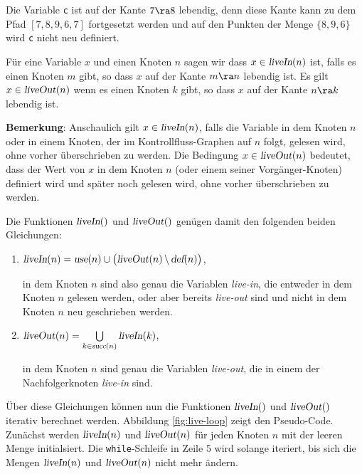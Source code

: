 \example
Die Variable \texttt{c} ist auf der Kante $7 \ra 8$ lebendig, denn diese Kante kann zu dem
Pfad $[7, 8, 9, 6, 7]$ fortgesetzt werden und auf den Punkten der Menge $\{8,9,6\}$ wird
\texttt{c} nicht neu definiert.

\begin{Definition}
F\"ur eine Variable $x$ und einen Knoten $n$ sagen wir dass $x \in \textsl{liveIn}(n)$ ist,
falls es einen Knoten $m$  gibt, so dass $x$ auf der Kante $m \ra n$ lebendig ist.
Es gilt $x \in \textsl{liveOut}(n)$ wenn es einen Knoten $k$ gibt, so dass $x$ auf der
Kante $n \ra k$ lebendig ist.
\end{Definition}

\noindent
\textbf{Bemerkung}: Anschaulich gilt $x \in \textsl{liveIn}(n)$, falls die Variable in dem
Knoten $n$ oder in einem Knoten, der im Kontrollfluss-Graphen auf $n$ folgt, gelesen wird,
ohne vorher \"uberschrieben zu werden.  Die Bedingung $x \in \textsl{liveOut}(n)$ bedeutet,
dass der Wert von $x$ in dem Knoten $n$ (oder einem seiner Vorg\"anger-Knoten) definiert
wird und sp\"ater noch gelesen wird, ohne vorher \"uberschrieben zu werden.

Die Funktionen $\textsl{liveIn}()$ und $\textsl{liveOut}()$ gen\"ugen damit den folgenden
beiden Gleichungen:
\begin{enumerate}
\item $\textsl{liveIn}(n) = 
       \textsl{use}(n) \cup \bigl(\textsl{liveOut}(n) \,\backslash\, \textsl{def}(n)\bigr)$,

      in dem Knoten $n$ sind also genau die Variablen \emph{live-in}, die entweder in dem
      Knoten $n$ gelesen werden, oder aber bereits \textsl{live-out} sind und nicht in dem
      Knoten $n$ neu geschrieben werden.
\item $\textsl{liveOut}(n) =
       \bigcup\limits_{k \in \textsl{succ}(n)} \textsl{liveIn}(k)$,

      in dem Knoten $n$ sind genau die Variablen \emph{live-out}, die in einem der
      Nachfolgerknoten \emph{live-in} sind.
\end{enumerate}
\"Uber diese Gleichungen k\"onnen nun die Funktionen $\textsl{liveIn}()$ und
$\textsl{liveOut}()$ iterativ berechnet werden.   Abbildung \ref{fig:live-loop} zeigt
den Pseudo-Code.  Zun\"achst werden  $\textsl{liveIn}(n)$ und
$\textsl{liveOut}(n)$ f\"ur jeden Knoten $n$ mit der leeren Menge initialsiert.
Die \texttt{while}-Schleife in Zeile 5 wird solange iteriert, bis sich
die Mengen $\textsl{liveIn}(n)$ und $\textsl{liveOut}(n)$ nicht mehr \"andern.


